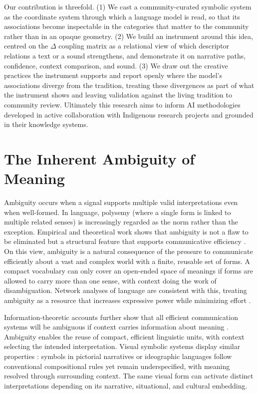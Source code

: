 \documentclass[final,creativeai]{article}
\begin{document}
Our contribution is threefold. (1) We cast a community-curated symbolic system as the coordinate system through which a language model is read, so that its associations become inspectable in the categories that matter to the community rather than in an opaque geometry. (2) We build an instrument around this idea, centred on the $\Delta$ coupling matrix as a relational view of which descriptor relations a text or a sound strengthens, and demonstrate it on narrative paths, confidence, context comparison, and sound. (3) We draw out the creative practices the instrument supports and report openly where the model's associations diverge from the tradition, treating these divergences as part of what the instrument shows and leaving validation against the living tradition to community review. Ultimately this research aims to inform AI methodologies developed in active collaboration with Indigenous research projects and grounded in their knowledge systems.

\section{The Inherent Ambiguity of Meaning}
Ambiguity occurs when a signal supports multiple valid interpretations even when well-formed. In language, polysemy (where a single form is linked to multiple related senses) is increasingly regarded as the norm rather than the exception. Empirical and theoretical work shows that ambiguity is not a flaw to be eliminated but a structural feature that supports communicative efficiency \citep{piantadosi_communicative_2012, hermalin_efficient_2019}. On this view, ambiguity is a natural consequence of the pressure to communicate efficiently about a vast and complex world with a finite, reusable set of forms. A compact vocabulary can only cover an open-ended space of meanings if forms are allowed to carry more than one sense, with context doing the work of disambiguation. Network analyses of language are consistent with this, treating ambiguity as a resource that increases expressive power while minimizing effort \citep{sole_ambiguity_2015}.

Information-theoretic accounts further show that all efficient communication systems will be ambiguous if context carries information about meaning \citep{piantadosi_communicative_2012}. Ambiguity enables the reuse of compact, efficient linguistic units, with context selecting the intended interpretation. Visual symbolic systems display similar properties \citep{cohn_visual_2013}: symbols in pictorial narratives or ideographic languages follow conventional compositional rules yet remain underspecified, with meaning resolved through surrounding context. The same visual form can activate distinct interpretations depending on its narrative, situational, and cultural embedding.
\end{document}
